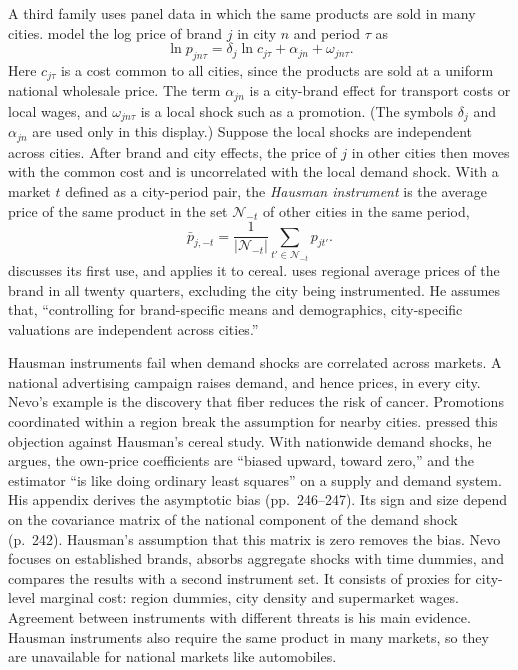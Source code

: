 A third family uses panel data in which the same products are sold in many cities.
\citet[p.~164]{HausmanLeonardZona1994} model the log price of brand $j$ in city $n$ and period $\tau$ as
\begin{equation}\label{eq:07-hlz-price}
  \ln p_{jn\tau} = \delta_j \ln c_{j\tau} + \alpha_{jn} + \omega_{jn\tau} .
\end{equation}
Here $c_{j\tau}$ is a cost common to all cities, since the products are sold at a uniform national wholesale price.
The term $\alpha_{jn}$ is a city-brand effect for transport costs or local wages, and $\omega_{jn\tau}$ is a local
shock such as a promotion. (The symbols $\delta_j$ and $\alpha_{jn}$ are used only in this display.) Suppose the local
shocks are independent across cities. After brand and city effects, the price of $j$ in other cities then moves with
the common cost and is uncorrelated with the local demand shock. With a market $t$ defined as a city-period pair, the
\emph{Hausman instrument} is the average price of the same product in the set $\mathcal{N}_{-t}$ of other cities in the
same period,
\begin{equation}\label{eq:07-hausman-iv}
  \bar p_{j,-t} = \frac{1}{|\mathcal{N}_{-t}|} \sum_{t' \in \mathcal{N}_{-t}} p_{jt'} .
\end{equation}
 discusses its first use, and \citet{Hausman1997} applies it to cereal. \citet[pp.~320--321]{Nevo2001}
uses regional average prices of the brand in all twenty quarters, excluding the city being instrumented. He assumes
that, ``controlling for brand-specific means and demographics, city-specific valuations are independent across
cities.''

Hausman instruments fail when demand shocks are correlated across markets. A national advertising campaign raises
demand, and hence prices, in every city. Nevo's example is the discovery that fiber reduces the risk of cancer.
Promotions coordinated within a region break the assumption for nearby cities. \citet[p.~242]{Bresnahan1997} pressed
this objection against Hausman's cereal study. With nationwide demand shocks, he argues, the own-price coefficients are
``biased upward, toward zero,'' and the estimator ``is like doing ordinary least squares'' on a supply and demand
system. His appendix derives the asymptotic bias (pp.~246--247). Its sign and size depend on the covariance matrix of
the national component of the demand shock (p.~242). Hausman's assumption that this matrix is zero removes the bias.
Nevo focuses on established brands, absorbs aggregate shocks with time dummies, and compares the
results with a second instrument set. It consists of proxies for city-level marginal cost: region dummies, city
density and supermarket wages. Agreement between instruments with different threats is his main evidence. Hausman
instruments also require the same product in many markets, so they are unavailable for national markets like
automobiles.

